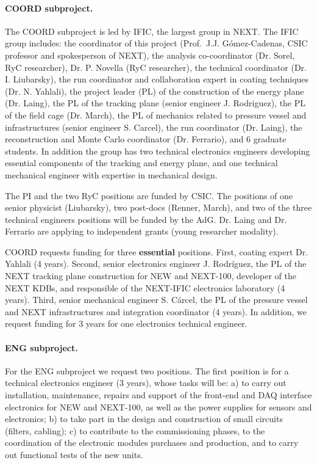 \paragraph{COORD subproject.}

The COORD subproject is led by IFIC, the largest group in NEXT. The IFIC group includes: the coordinator of this project (Prof.~J.J. G\'omez-Cadenas, CSIC professor and spokesperson of NEXT), the analysis co-coordinator (Dr. Sorel, RyC researcher), Dr. P. Novella (RyC researcher), the technical coordinator (Dr. I. Liubarsky), the run coordinator and collaboration expert in coating techniques (Dr. N. Yahlali), the project leader (PL) of the construction of the energy plane (Dr. Laing), the PL of the tracking plane (senior engineer J. Rodriguez), the PL of the field cage (Dr. March), the PL of mechanics related to pressure vessel and infrastructures (senior engineer S. Carcel), the run coordinator (Dr. Laing), the reconstruction and Monte Carlo coordinator (Dr. Ferrario), and 6 graduate students. In addition the group has two technical electronics engineers developing essential components of the tracking and energy plane, and one technical mechanical engineer with expertise in mechanical design. 

The PI and the two RyC positions are funded by CSIC. The positions of one senior physicist (Liubarsky), two post-docs (Renner, March), and two of the three technical engineers positions will be funded by the AdG. Dr. Laing and Dr. Ferrario are applying to independent grants (young researcher modality). 

COORD requests funding for three {\bf essential} positions. First, coating expert Dr. Yahlali (4 years). Second, senior electronics engineer J. Rodríguez, the PL of the NEXT tracking plane construction for NEW and NEXT-100, developer of the NEXT KDBs, and responsible of the NEXT-IFIC electronics laboratory (4 years). Third, senior mechanical engineer S. Cárcel, the PL of the pressure vessel and NEXT infrastructures and integration coordinator (4 years). In addition, we request funding for 3 years for one electronics technical engineer.  

\paragraph{ENG subproject.}

For the ENG subproject we request two positions. The first position is for a technical electronics engineer (3 years), whose tasks will be: a) to carry out installation, maintenance, repairs and support of the front-end and DAQ interface electronics for NEW and NEXT-100, as well as the power supplies for sensors and electronics; b) to take part in the design and construction of small circuits (filters, cabling); c) to contribute to the commissioning phases, to the coordination of the electronic modules purchases and production, and to carry out functional tests of the new units. 

